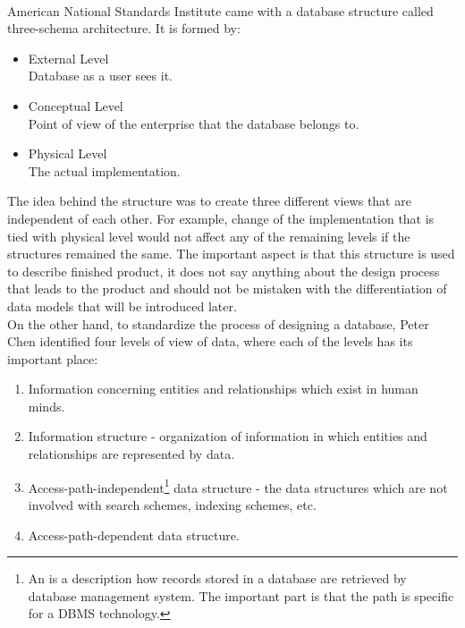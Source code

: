 \\

American National Standards Institute \cite{ANSIArchitecture75} came with a database structure called three-schema architecture. It is formed by:
\begin{itemize}
	\item External Level \\ Database as a user sees it. 
	\item Conceptual Level \\ Point of view of the enterprise that the database belongs to.
	\item Physical Level \\ The actual implementation.
\end{itemize}

The idea behind the structure was to create three different views that are independent of each other. 
For example, change of the implementation that is tied with physical level would not affect any of the remaining levels if the structures remained the same. 
The important aspect is that this structure is used to describe finished product, it does not say anything about the design process that leads to the product and should not be mistaken with the differentiation of data models that will be introduced later.\\

On the other hand, to standardize the process of designing a database, Peter Chen \cite{Chen76theentity-relationship} identified four levels of view of data, where each of the levels has its important place: \\
\begin{enumerate}
	\item Information concerning entities and relationships which exist in human minds.
	\item Information structure - organization of information in which entities and relationships are represented by data.
	\item Access-path-independent\footnote{An  is a description how records stored in a database are retrieved by database management system\cite{AccessPathDefiniton}. The important part is that the path is specific for a DBMS technology.} data structure - the data structures which are not involved with search schemes, indexing schemes, etc.
	\item Access-path-dependent data structure.
\end{enumerate}


